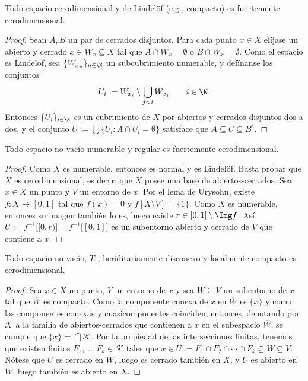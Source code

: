 \documentclass[topologia-analisis.tex]{subfiles}
\begin{document}
\begin{thm}
	Todo espacio cerodimensional y de Lindelöf (e.g., compacto) es fuertemente cerodimensional.
\end{thm}
\begin{proof}
	Sean $A, B$ un par de cerrados disjuntos.
	Para cada punto $x \in X$ elíjase un abierto y cerrado $x \in W_x \subseteq X$ tal que $A \cap W_x = \emptyset$ o $B \cap W_x = \emptyset$.
	Como el espacio es Lindelöf, sea $\{ W_{x_n} \}_{n\in\N}$ un subcubrimiento numerable, y defínanse los conjuntos
	$$ U_i := W_{x_i} \setminus \bigcup_{j<i} W_{x_j} \qquad i\in\N. $$
	Entonces $\{ U_i \}_{i\in\N}$ es un cubrimiento de $X$ por abiertos y cerrados disjuntos dos a dos, y el conjunto
	$U := \bigcup \{ U_i : A \cap U_i = \emptyset \}$ satisface que $A \subseteq U \subseteq B^c$.
\end{proof}

\begin{cor}
	Todo espacio no vacío numerable y regular es fuertemente cerodimensional.
\end{cor}
\begin{proof}
	Como $X$ es numerable, entonces es normal y es Lindelöf.
	Basta probar que $X$ es cerodimensional, es decir, que $X$ posee una base de abiertos-cerrados.
	Sea $x \in X$ un punto y $V$ un entorno de $x$.
	Por el lema de Urysohn, existe $f \colon X \to [0, 1]$ tal que $f(x) = 0$ y $f[X \setminus V] = \{ 1 \}$.
	Como $X$ es numerable, entonces su imagen también lo es, luego existe $r \in [0, 1] \setminus \Img f$.
	Así, $U := f^{-1}\big[ [0, r) \big] = f^{-1}\big[ [0, 1] \big]$ es un subentorno abierto y cerrado de $V$ que contiene a $x$.
\end{proof}

\begin{thm}
	Todo espacio no vacío, $T_1$, heriditariamente disconexo y localmente compacto es cerodimensional.
\end{thm}
\begin{proof}
	Sea $x \in X$ un punto, $V$ un entorno de $x$ y sea $W \subseteq V$ un subentorno de $x$ tal que $\overline{W}$ es compacto.
	Como la componente conexa de $x$ en $\overline{W}$ es $\{ x \}$ y como las componentes conexas y cuasicomponentes coinciden,
	entonces, denotando por $\mathcal{K}$ a la familia de abiertos-cerrados que contienen a $x$ en el subespacio $\overline{W}$,
	se cumple que $\{ x \} = \bigcap \mathcal{K}$.
	Por la propiedad de las intersecciones finitas, tenemos que existen finitos $F_1, \dots, F_k \in \mathcal{K}$
	tales que $x \in U := F_1 \cap F_2 \cap \cdots \cap F_k \subseteq W \subseteq V$.
	Nótese que $U$ es cerrado en $\overline{W}$, luego es cerrado también en $X$, y $U$ es abierto en $W$, luego también es abierto en $X$.
\end{proof}
\end{document}
